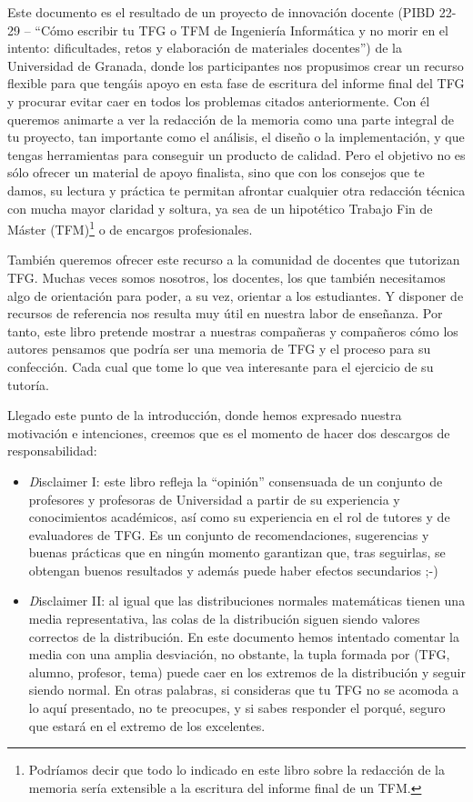 Este documento es el resultado de un proyecto de innovación docente (PIBD 22-29 -- ``Cómo escribir tu TFG o TFM de Ingeniería Informática y no morir en el intento: dificultades, retos y elaboración de materiales docentes'') de la Universidad de Granada, donde los participantes nos propusimos crear un recurso flexible para que tengáis apoyo en esta fase de escritura del informe final del TFG y procurar evitar caer en todos los problemas citados anteriormente. Con él queremos animarte a ver la redacción de la memoria como una parte integral de tu proyecto, tan importante como el análisis, el diseño o la implementación, y que tengas herramientas para conseguir un producto de calidad. Pero el objetivo no es sólo ofrecer un material de apoyo finalista, sino que con los consejos que te damos, su lectura y práctica te permitan afrontar cualquier otra redacción técnica con mucha mayor claridad y soltura, ya sea de un hipotético Trabajo Fin de Máster (TFM)\footnote{Podríamos decir que todo lo indicado en este libro sobre la redacción de la memoria sería extensible a la escritura del informe final de un TFM.} o de encargos profesionales.

También queremos ofrecer este recurso a la comunidad de docentes que tutorizan TFG. Muchas veces somos nosotros, los docentes, los que también necesitamos algo de orientación para poder, a su vez, orientar a los estudiantes. Y disponer de recursos de referencia nos resulta muy útil en nuestra labor de enseñanza. Por tanto, este libro pretende mostrar a nuestras compañeras y compañeros cómo los autores pensamos que podría ser una memoria de TFG y el proceso para su confección. Cada cual que tome lo que vea interesante para el ejercicio de su tutoría.

Llegado este punto de la introducción, donde hemos expresado nuestra motivación e intenciones, creemos que es el momento de hacer dos descargos de responsabilidad:

\begin{itemize}
    \item {\textit Disclaimer} I: este libro refleja la ``opinión'' consensuada de un conjunto de profesores y profesoras de Universidad a partir de su experiencia y conocimientos académicos, así como su experiencia en el rol de tutores y de evaluadores de TFG. Es un conjunto de recomendaciones, sugerencias y buenas prácticas que en ningún momento garantizan que, tras seguirlas, se obtengan buenos resultados y además puede haber efectos secundarios ;-) 

    \item {\textit Disclaimer} II: al igual que las distribuciones normales matemáticas tienen una media representativa, las colas de la distribución siguen siendo valores correctos de la distribución. En este documento hemos intentado comentar la media con una amplia desviación, no obstante, la tupla formada por (TFG, alumno, profesor, tema) puede caer en los extremos de la distribución y seguir siendo normal. En otras palabras, si consideras que tu TFG no se acomoda a lo aquí presentado, no te preocupes, y si sabes responder el porqué, seguro que estará en el extremo de los excelentes. 
    
\end{itemize}

